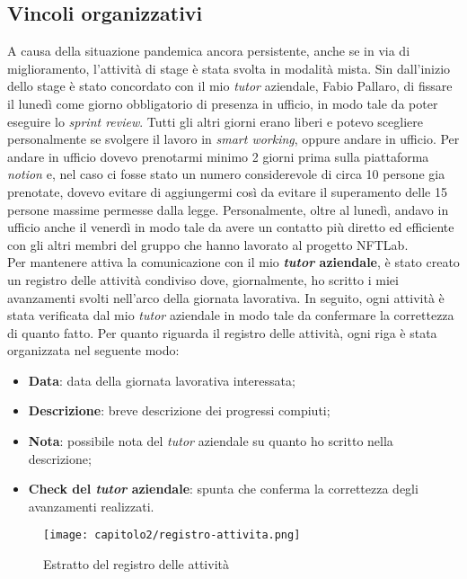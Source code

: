 \subsection{Vincoli organizzativi}
A causa della situazione pandemica ancora persistente, anche se in via di miglioramento, l'attività di stage è stata svolta in modalità mista. Sin dall'inizio dello stage è stato concordato con il mio \emph{tutor} aziendale, Fabio Pallaro, di fissare il lunedì come giorno obbligatorio di presenza in ufficio, in modo tale da poter eseguire lo \emph{sprint review}. 
Tutti gli altri giorni erano liberi e potevo scegliere personalmente se svolgere il lavoro in \emph{smart working}, oppure andare in ufficio. Per andare in ufficio dovevo prenotarmi minimo 2 giorni prima sulla piattaforma \emph{notion} e, nel caso ci fosse stato un numero considerevole di circa 10 persone gia prenotate, dovevo evitare di aggiungermi così da evitare il superamento delle 15 persone massime permesse dalla legge.
Personalmente, oltre al lunedì, andavo in ufficio anche il venerdì in modo tale da avere un contatto più diretto ed efficiente con gli altri membri del gruppo che hanno lavorato al progetto NFTLab.\\

Per mantenere attiva la comunicazione con il mio \textbf{\emph{tutor} aziendale}, è stato creato un registro delle attività condiviso dove, giornalmente, ho scritto i miei avanzamenti svolti nell'arco della giornata lavorativa. In seguito, ogni attività è stata verificata dal mio \emph{tutor} aziendale in modo tale da confermare la correttezza di quanto fatto. Per quanto riguarda il registro delle attività, ogni riga è stata organizzata nel seguente modo:
\begin{itemize}
  \item \textbf{Data}: data della giornata lavorativa interessata;
  \item \textbf{Descrizione}: breve descrizione dei progressi compiuti; 
  \item \textbf{Nota}: possibile nota del \emph{tutor} aziendale su quanto ho scritto nella descrizione;
  \item \textbf{Check del \emph{tutor} aziendale}: spunta che conferma la correttezza degli avanzamenti realizzati.
\end{itemize}

\begin{figure}[!h]
  \centering
  \texttt{[image: capitolo2/registro-attivita.png]}
  \caption{Estratto del registro delle attività}
\end{figure}


